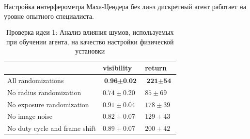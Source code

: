 \begin{frame}[allowframebreaks]{Настройка интерферометра Маха-Цендера без линз}
 дискретный агент работает на уровне опытного специалиста.

\framebreak 

\begin{table} [htbp]
    \centering
    \begin{threeparttable}
        \caption*{{\color{orange} Проверка идеи 1:} Анализ влияния шумов, используемых при обучении агента, на качество настройки физической установки}
        \begin{tabular}{| p{5cm} || p{2cm} || p{2cm} |}
            \hline
            \hline
             & visibility & return \\
            \hline
            All randomizations  & $\textbf{0.96} \pm \textbf{0.02}$ & $\textbf{221} \pm \textbf{54}$ \\
            No radius randomization & $0.74 \pm 0.20$ & $85 \pm 69$ \\
            No exposure randomization& $0.91 \pm 0.04$ & $178 \pm 39$ \\
            No image noise & $0.82 \pm 0.07$ & $129 \pm 43$ \\
            No duty cycle and frame shift  &  $0.89 \pm 0.07$ & $200 \pm 42$ \\
            \hline
            \hline
        \end{tabular}
    \end{threeparttable}
\end{table}
\end{frame}

